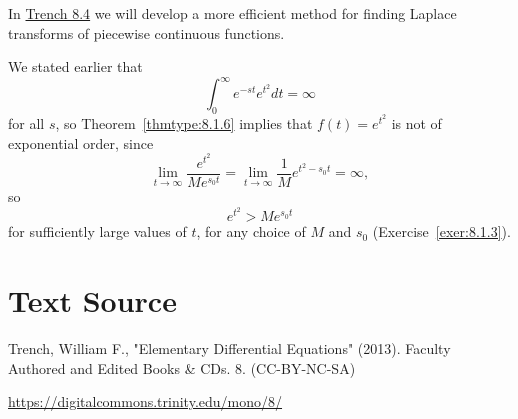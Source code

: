 \documentclass{ximera}
\begin{document}
\begin{remark}
In \href{https://ximera.osu.edu/ode/main/unitStepFunction/unitStepFunction}{Trench 8.4} we will develop a more efficient
method for finding Laplace transforms of piecewise continuous functions.
\end{remark}

\begin{example}\label{example:8.1.11}
We stated  earlier that
$$
\int_0^\infty e^{-st} e^{t^2} dt=\infty
$$
for all $s$, so Theorem~\ref{thmtype:8.1.6} implies that $f(t)=e^{t^2}$
is not  of exponential order, since
$$
\lim_{t\rightarrow\infty} \frac{e^{t^2}}{Me^{s_0t}}=\lim_{t\rightarrow\infty} \frac{1}{M} e^{t^2-s_0t}=\infty,
$$
so
$$
e^{t^2}>Me^{s_0t}
$$
for sufficiently large values of $t$, for any choice of $M$ and $s_{0}$
(Exercise~\ref{exer:8.1.3}).
\end{example}


\section*{Text Source}
Trench, William F., "Elementary Differential Equations" (2013). Faculty Authored and Edited Books \& CDs. 8. (CC-BY-NC-SA)

\href{https://digitalcommons.trinity.edu/mono/8/}{https://digitalcommons.trinity.edu/mono/8/}
\end{document}
